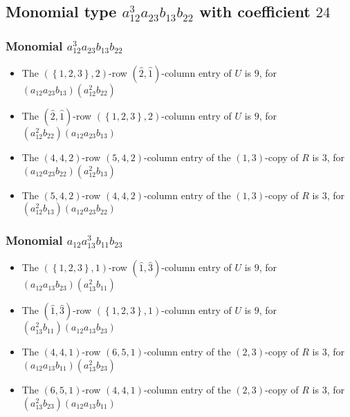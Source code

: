 \documentclass{article}
\begin{document}
\subsection{Monomial type $ a_{12}^{3} a_{23} b_{13} b_{22} $ with coefficient $ 24 $}

\subsubsection{Monomial $ a_{12}^{3} a_{23} b_{13} b_{22} $}

\begin{itemize}
\item The $ \left(\left\{1, 2, 3\right\}, 2\right) $-row $ (\hat{2}, \hat{1}) $-column entry of $U$ is $ 9 $, for $( a_{12} a_{23} b_{13} )( a_{12}^{2} b_{22} )$ 
\item The $(\hat{2}, \hat{1})$-row $ \left(\left\{1, 2, 3\right\}, 2\right) $-column entry of $U$ is $ 9 $, for $( a_{12}^{2} b_{22} )( a_{12} a_{23} b_{13} )$ 
\item The $(4, 4, 2)$-row $(5, 4, 2)$-column entry of the $ \left(1, 3\right) $-copy of $R$ is $ 3 $, for $( a_{12} a_{23} b_{22} )( a_{12}^{2} b_{13} )$ 
\item The $(5, 4, 2)$-row $(4, 4, 2)$-column entry of the $ \left(1, 3\right) $-copy of $R$ is $ 3 $, for $( a_{12}^{2} b_{13} )( a_{12} a_{23} b_{22} )$ 
\end{itemize}
\subsubsection{Monomial $ a_{12} a_{13}^{3} b_{11} b_{23} $}

\begin{itemize}
\item The $ \left(\left\{1, 2, 3\right\}, 1\right) $-row $ (\hat{1}, \hat{3}) $-column entry of $U$ is $ 9 $, for $( a_{12} a_{13} b_{23} )( a_{13}^{2} b_{11} )$ 
\item The $(\hat{1}, \hat{3})$-row $ \left(\left\{1, 2, 3\right\}, 1\right) $-column entry of $U$ is $ 9 $, for $( a_{13}^{2} b_{11} )( a_{12} a_{13} b_{23} )$ 
\item The $(4, 4, 1)$-row $(6, 5, 1)$-column entry of the $ \left(2, 3\right) $-copy of $R$ is $ 3 $, for $( a_{12} a_{13} b_{11} )( a_{13}^{2} b_{23} )$ 
\item The $(6, 5, 1)$-row $(4, 4, 1)$-column entry of the $ \left(2, 3\right) $-copy of $R$ is $ 3 $, for $( a_{13}^{2} b_{23} )( a_{12} a_{13} b_{11} )$ 
\end{itemize}
\end{document}
